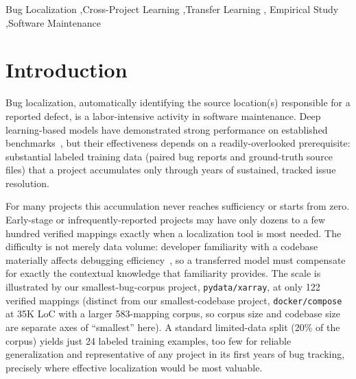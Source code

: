 \documentclass[a4paper,fleqn]{cas-dc}
\begin{document}
\begin{keywords}
Bug Localization \sep Cross-Project Learning \sep Transfer Learning \sep
Empirical Study \sep Software Maintenance
\end{keywords}

\maketitle

\section{Introduction} \label{sec:intro}

Bug localization, automatically identifying the source location(s) responsible for a reported defect, is a labor-intensive activity in software maintenance. Deep learning-based models have demonstrated strong performance on established benchmarks~\citep{lam2017bug,liang2022modeling,ciborowska2022fast,hossain2024deepdive,zhu2025funloc}, but their effectiveness depends on a readily-overlooked prerequisite: substantial labeled training data (paired bug reports and ground-truth source files) that a project accumulates only through years of sustained, tracked issue resolution.

For many projects this accumulation never reaches sufficiency or starts from zero. Early-stage or infrequently-reported projects may have only dozens to a few hundred verified mappings exactly when a localization tool is most needed. The difficulty is not merely data volume: developer familiarity with a codebase materially affects debugging efficiency~\citep{wang2020familiarity}, so a transferred model must compensate for exactly the contextual knowledge that familiarity provides. The scale is illustrated by our smallest-bug-corpus project, \texttt{pydata/xarray}, at only 122 verified mappings (distinct from our smallest-codebase project, \texttt{docker/compose} at 35K LoC with a larger 583-mapping corpus, so corpus size and codebase size are separate axes of ``smallest'' here). A standard limited-data split (20\% of the corpus) yields just 24 labeled training examples, too few for reliable generalization and representative of any project in its first years of bug tracking, precisely where effective localization would be most valuable.
\end{document}
